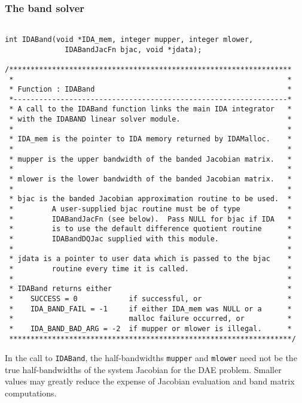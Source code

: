 \subsubsection{The band solver}

\small
\begin{verbatim}

int IDABand(void *IDA_mem, integer mupper, integer mlower,
              IDABandJacFn bjac, void *jdata);
 
/******************************************************************
 *                                                                *
 * Function : IDABand                                             *
 *----------------------------------------------------------------*
 * A call to the IDABand function links the main IDA integrator   *
 * with the IDABAND linear solver module.                         *
 *                                                                *
 * IDA_mem is the pointer to IDA memory returned by IDAMalloc.    *
 *                                                                *
 * mupper is the upper bandwidth of the banded Jacobian matrix.   *
 *                                                                *
 * mlower is the lower bandwidth of the banded Jacobian matrix.   *
 *                                                                *
 * bjac is the banded Jacobian approximation routine to be used.  *
 *         A user-supplied bjac routine must be of type           *
 *         IDABandJacFn (see below).  Pass NULL for bjac if IDA   *
 *         is to use the default difference quotient routine      *
 *         IDABandDQJac supplied with this module.                *
 *                                                                *
 * jdata is a pointer to user data which is passed to the bjac    *
 *         routine every time it is called.                       *
 *                                                                *
 * IDABand returns either                                         *
 *    SUCCESS = 0            if successful, or                    *
 *    IDA_BAND_FAIL = -1     if either IDA_mem was NULL or a      *
 *                           malloc failure occurred, or          *
 *    IDA_BAND_BAD_ARG = -2  if mupper or mlower is illegal.      *
 ******************************************************************/

\end{verbatim}
\normalsize

In the call to {\tt IDABand}, the half-bandwidths {\tt mupper} and
{\tt mlower} need not be the true half-bandwidths of the system
Jacobian for the DAE problem.  Smaller values may greatly reduce the
expense of Jacobian evaluation and band matrix computations.

